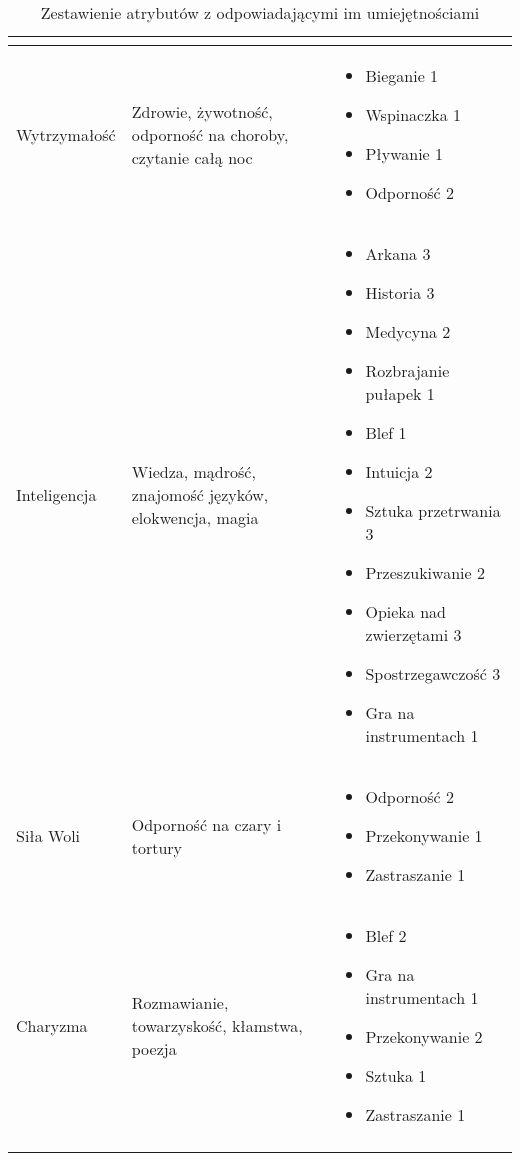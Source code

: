 \begin{longtable}[c]{m{}m{}m{}}
\begin{itemize}
	\end{itemize}\\\midrule
	Wytrzymałość &
	Zdrowie, żywotność, odporność na choroby, czytanie całą noc &
	\begin{itemize}
		\item Bieganie 1
		\item Wspinaczka 1
		\item Pływanie 1
		\item Odporność 2
	\end{itemize}\\ \midrule
	Inteligencja &
	Wiedza, mądrość, znajomość języków, elokwencja, magia &
	\begin{itemize}
		\item Arkana 3
		\item Historia 3
		\item Medycyna 2
		\item Rozbrajanie pułapek 1
		\item Blef 1
		\item Intuicja 2
		\item Sztuka przetrwania 3
		\item Przeszukiwanie 2
		\item Opieka nad zwierzętami 3
		\item Spostrzegawczość 3
		\item Gra na instrumentach 1
	\end{itemize}\\ \midrule
	Siła Woli &
	Odporność na czary i tortury &
	\begin{itemize}
		\item Odporność 2
		\item Przekonywanie 1
		\item Zastraszanie 1
	\end{itemize}\\ \midrule
	Charyzma &
	Rozmawianie, towarzyskość, kłamstwa, poezja &
	\begin{itemize}
		\item Blef 2
		\item Gra na instrumentach 1
		\item Przekonywanie 2
		\item Sztuka 1
		\item Zastraszanie 1
	\end{itemize}
	\\ \bottomrule

\caption{Zestawienie atrybutów z odpowiadającymi im umiejętnościami}
\label{tab:attr}
\end{longtable}

